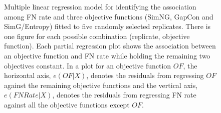 \begin{figure}[!htbp]
\begin{adjustwidth}{-1cm}{-1cm}
\begin{tabular}{l||C{0.24\textwidth}|C{0.24\textwidth}|C{0.24\textwidth}|C{0.24\textwidth} }
			 & 
			 & 
			\\\hline
		\end{tabular}	
		\caption{Multiple linear regression model for identifying the association among FN rate and three objective functions (SimNG, GapCon and SimG/Entropy) fitted to five randomly selected replicates. There is one figure for each possible combination (replicate, objective function). Each partial regression plot shows the association between an objective function and FN rate while holding the remaining two objectives constant.  In a plot for an objective function $ OF $, the horizontal axis, $e(OF|X)$, denotes the residuals from regressing $OF$ against the remaining objective functions and the vertical axis, $e(FNRate|X)$, denotes the residuals from regressing FN rate against all the objective functions except $ OF $.}
		\label{fig:new_mul_lin_reg}
	\end{adjustwidth}
\end{figure}
